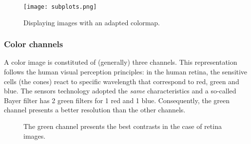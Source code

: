 \begin{figure}[H]
\centering\caption{Displaying images with an adapted colormap.}%
 \texttt{[image: subplots.png]}%
 \label{fig:introduction:python:display}%
\end{figure}

\subsubsection{Color channels}
A color image is constituted of (generally) three channels. This representation follows the human visual perception principles: in the human retina, the sensitive cells (the cones) react to specific wavelength that correspond to red, green and blue. The sensors technology adopted the \textit{same} characteristics and a so-called Bayer filter has 2 green filters for 1 red and 1 blue. Consequently, the green channel presents a better resolution than the other channels.

\begin{figure}[H]
 \centering\caption{The green channel presents the best contrasts in the case of retina images.}%
 \hfill
 \hfill
 \hfill
 \label{fig:introduction:python:channels}%
 \vspace*{-10pt}%
\end{figure}


